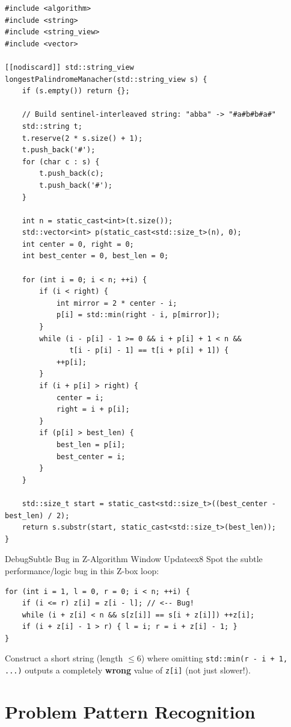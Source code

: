 \documentclass[11pt,a4paper]{article}
\theoremstyle{definition}
\begin{document}
\begin{lstlisting}[caption={O(N) Longest Palindromic Substring via Manacher's Algorithm}]
#include <algorithm>
#include <string>
#include <string_view>
#include <vector>

[[nodiscard]] std::string_view longestPalindromeManacher(std::string_view s) {
    if (s.empty()) return {};

    // Build sentinel-interleaved string: "abba" -> "#a#b#b#a#"
    std::string t;
    t.reserve(2 * s.size() + 1);
    t.push_back('#');
    for (char c : s) {
        t.push_back(c);
        t.push_back('#');
    }

    int n = static_cast<int>(t.size());
    std::vector<int> p(static_cast<std::size_t>(n), 0);
    int center = 0, right = 0;
    int best_center = 0, best_len = 0;

    for (int i = 0; i < n; ++i) {
        if (i < right) {
            int mirror = 2 * center - i;
            p[i] = std::min(right - i, p[mirror]);
        }
        while (i - p[i] - 1 >= 0 && i + p[i] + 1 < n &&
               t[i - p[i] - 1] == t[i + p[i] + 1]) {
            ++p[i];
        }
        if (i + p[i] > right) {
            center = i;
            right = i + p[i];
        }
        if (p[i] > best_len) {
            best_len = p[i];
            best_center = i;
        }
    }

    std::size_t start = static_cast<std::size_t>((best_center - best_len) / 2);
    return s.substr(start, static_cast<std::size_t>(best_len));
}
\end{lstlisting}

\begin{tryitbox}{Debug}{Subtle Bug in Z-Algorithm Window Update}{ex8}
Spot the subtle performance/logic bug in this Z-box loop:
\begin{lstlisting}[numbers=none, xleftmargin=4pt, framexleftmargin=4pt]
for (int i = 1, l = 0, r = 0; i < n; ++i) {
    if (i <= r) z[i] = z[i - l]; // <-- Bug!
    while (i + z[i] < n && s[z[i]] == s[i + z[i]]) ++z[i];
    if (i + z[i] - 1 > r) { l = i; r = i + z[i] - 1; }
}
\end{lstlisting}
Construct a short string (length $\le 6$) where omitting \texttt{std::min(r - i + 1, ...)} outputs a completely \textbf{wrong} value of \texttt{z[i]} (not just slower!).
\end{tryitbox}

\section{Problem Pattern Recognition}
\end{document}
